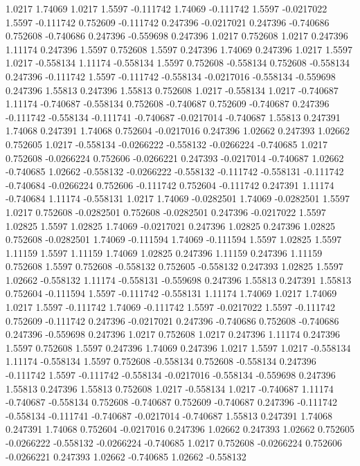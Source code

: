 1.0217 1.74069
1.0217 1.5597
-0.111742 1.74069
-0.111742 1.5597
-0.0217022 1.5597
-0.111742 0.752609
-0.111742 0.247396
-0.0217021 0.247396
-0.740686 0.752608
-0.740686 0.247396
-0.559698 0.247396
1.0217 0.752608
1.0217 0.247396
1.11174 0.247396
1.5597 0.752608
1.5597 0.247396
1.74069 0.247396
1.0217 1.5597
1.0217 -0.558134
1.11174 -0.558134
1.5597 0.752608
-0.558134 0.752608
-0.558134 0.247396
-0.111742 1.5597
-0.111742 -0.558134
-0.0217016 -0.558134
-0.559698 0.247396
1.55813 0.247396
1.55813 0.752608
1.0217 -0.558134
1.0217 -0.740687
1.11174 -0.740687
-0.558134 0.752608
-0.740687 0.752609
-0.740687 0.247396
-0.111742 -0.558134
-0.111741 -0.740687
-0.0217014 -0.740687
1.55813 0.247391
1.74068 0.247391
1.74068 0.752604
-0.0217016 0.247396
1.02662 0.247393
1.02662 0.752605
1.0217 -0.558134
-0.0266222 -0.558132
-0.0266224 -0.740685
1.0217 0.752608
-0.0266224 0.752606
-0.0266221 0.247393
-0.0217014 -0.740687
1.02662 -0.740685
1.02662 -0.558132
-0.0266222 -0.558132
-0.111742 -0.558131
-0.111742 -0.740684
-0.0266224 0.752606
-0.111742 0.752604
-0.111742 0.247391
1.11174 -0.740684
1.11174 -0.558131
1.0217 1.74069
-0.0282501 1.74069
-0.0282501 1.5597
1.0217 0.752608
-0.0282501 0.752608
-0.0282501 0.247396
-0.0217022 1.5597
1.02825 1.5597
1.02825 1.74069
-0.0217021 0.247396
1.02825 0.247396
1.02825 0.752608
-0.0282501 1.74069
-0.111594 1.74069
-0.111594 1.5597
1.02825 1.5597
1.11159 1.5597
1.11159 1.74069
1.02825 0.247396
1.11159 0.247396
1.11159 0.752608
1.5597 0.752608
-0.558132 0.752605
-0.558132 0.247393
1.02825 1.5597
1.02662 -0.558132
1.11174 -0.558131
-0.559698 0.247396
1.55813 0.247391
1.55813 0.752604
-0.111594 1.5597
-0.111742 -0.558131
1.11174 1.74069
1.0217 1.74069
1.0217 1.5597
-0.111742 1.74069
-0.111742 1.5597
-0.0217022 1.5597
-0.111742 0.752609
-0.111742 0.247396
-0.0217021 0.247396
-0.740686 0.752608
-0.740686 0.247396
-0.559698 0.247396
1.0217 0.752608
1.0217 0.247396
1.11174 0.247396
1.5597 0.752608
1.5597 0.247396
1.74069 0.247396
1.0217 1.5597
1.0217 -0.558134
1.11174 -0.558134
1.5597 0.752608
-0.558134 0.752608
-0.558134 0.247396
-0.111742 1.5597
-0.111742 -0.558134
-0.0217016 -0.558134
-0.559698 0.247396
1.55813 0.247396
1.55813 0.752608
1.0217 -0.558134
1.0217 -0.740687
1.11174 -0.740687
-0.558134 0.752608
-0.740687 0.752609
-0.740687 0.247396
-0.111742 -0.558134
-0.111741 -0.740687
-0.0217014 -0.740687
1.55813 0.247391
1.74068 0.247391
1.74068 0.752604
-0.0217016 0.247396
1.02662 0.247393
1.02662 0.752605
-0.0266222 -0.558132
-0.0266224 -0.740685
1.0217 0.752608
-0.0266224 0.752606
-0.0266221 0.247393
1.02662 -0.740685
1.02662 -0.558132
